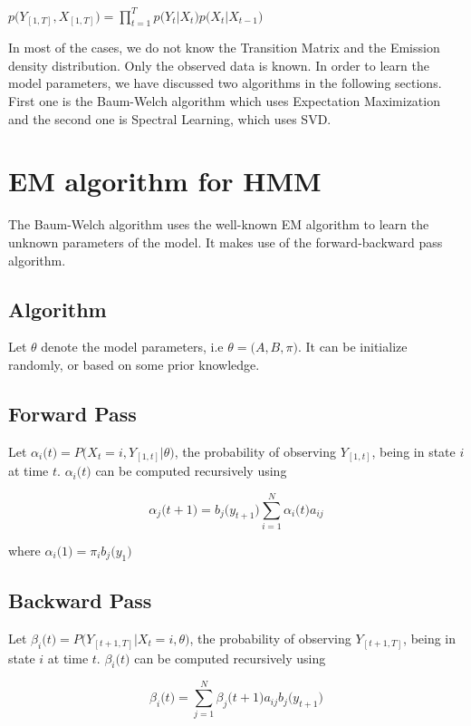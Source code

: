 \documentclass{article} %
\begin{document}
\begin{center} \(  p\big( Y_{[1,T]}, X_{[1,T]} \big) = \prod_{t=1}^{T}p\big(Y_t|X_t\big)p\big(X_t|X_{t-1}\big)  \)
\end{center}

In most of the cases, we do not know the Transition Matrix and the Emission density distribution. Only
the observed data is known. In order to learn the model parameters, we have discussed two algorithms in the following sections. First one is the Baum-Welch algorithm which uses Expectation Maximization and the second one is Spectral Learning, which uses SVD.

\section{EM algorithm for HMM}
\label{EM algorithm}
The Baum-Welch algorithm uses the well-known EM algorithm to learn the unknown parameters of the model. It makes use of the forward-backward pass algorithm. 

\subsection*{Algorithm}
Let $\theta$ denote the model parameters, i.e \( \theta = \big(A,B,\pi\big) \). It can be initialize randomly, or based on some prior knowledge.

\subsection*{Forward Pass}
Let $\alpha_i\big(t\big) = P\big(X_t=i,Y_{[1,t]}|\theta\big)$, the probability of observing  $Y_{[1,t]}$, being in state $i$ at time $t$. $\alpha_i\big(t\big)$ can be computed recursively using

\[\alpha_j\big(t+1\big) = b_j\big(y_{t+1}\big)\sum_{i=1}^N\alpha_i\big(t\big)a_{ij}\]

where $\alpha_i\big(1\big) = \pi_ib_j\big(y_1\big)$

\subsection*{Backward Pass}
Let $\beta_i\big(t\big) = P\big(Y_{[t+1,T]}|X_t=i,\theta\big)$, the probability of observing  $Y_{[t+1,T]}$, being in state $i$ at time $t$. $\beta_i\big(t\big)$ can be computed recursively using

\[\beta_i\big(t\big) = \sum_{j=1}^N\beta_j\big(t+1\big)a_{ij}b_j\big(y_{t+1}\big) \]
\end{document}
